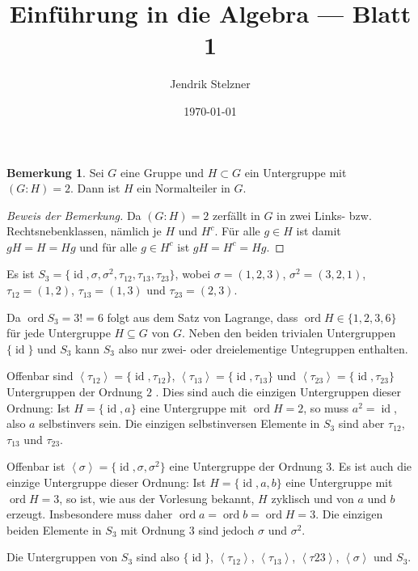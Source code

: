 \documentclass[a4paper,10pt]{article}
\title{Einführung in die Algebra — Blatt 1}
\author{Jendrik Stelzner}
\date{\today}
\theoremstyle{definition}
\newtheorem*{bem}{Bemerkung}
\newcommand{\id}{\operatorname{id}}
\newcommand{\ord}{\operatorname{ord}}
\newcommand{\gen}[1]{\left\langle#1\right\rangle}
\begin{document}
\maketitle





\section{}

\begin{bem}
 Sei $G$ eine Gruppe und $H \subset G$ ein Untergruppe mit $(G : H) = 2$. Dann ist $H$ ein Normalteiler in $G$.
\end{bem}
\begin{proof}[Beweis der Bemerkung]
 Da $(G : H) = 2$ zerfällt in $G$ in zwei Links- bzw. Rechtsnebenklassen, nämlich je $H$ und $H^c$. Für alle $g \in H$ ist damit $gH = H = Hg$ und für alle $g \in H^c$ ist $gH = H^c = Hg$.
\end{proof}

Es ist $S_3 = \{\id, \sigma, \sigma^2, \tau_{12}, \tau_{13}, \tau_{23} \}$, wobei $\sigma = (1,2,3)$, $\sigma^2 = (3,2,1)$, $\tau_{12} = (1,2)$, $\tau_{13} = (1,3)$ und $\tau_{23} = (2,3)$.

Da $\ord S_3 = 3! = 6$ folgt aus dem Satz von Lagrange, dass $\ord H \in \{1,2,3,6\}$ für jede Untergruppe $H \subseteq G$ von $G$. Neben den beiden trivialen Untergruppen $\{\id\}$ und $S_3$ kann $S_3$ also nur zwei- oder dreielementige Untegruppen enthalten.

Offenbar sind $\gen{\tau_{12}} = \{\id,\tau_{12}\}$, $\gen{\tau_{13}} = \{\id, \tau_{13}\}$ und $\gen{\tau_{23}} = \{\id, \tau_{23}\}$ Untergruppen der Ordnung $2$ . Dies sind auch die einzigen Untergruppen dieser Ordnung: Ist $H = \{\id, a\}$ eine Untergruppe mit $\ord H = 2$, so muss $a^2 = \id$, also $a$ selbstinvers sein. Die einzigen selbstinversen Elemente in $S_3$ sind aber $\tau_{12}$, $\tau_{13}$ und $\tau_{23}$.

Offenbar ist $\gen{\sigma} = \{\id, \sigma, \sigma^2\}$ eine Untergruppe der Ordnung $3$. Es ist auch die einzige Untergruppe dieser Ordnung: Ist $H = \{\id, a, b\}$ eine Untergruppe mit $\ord H = 3$, so ist, wie aus der Vorlesung bekannt, $H$ zyklisch und von $a$ und $b$ erzeugt. Insbesondere muss daher $\ord a = \ord b = \ord H = 3$. Die einzigen beiden Elemente in $S_3$ mit Ordnung $3$ sind jedoch $\sigma$ und $\sigma^2$.

Die Untergruppen von $S_3$ sind also $\{\id\}$, $\gen{\tau_{12}}$, $\gen{\tau_{13}}$, $\gen{\tau{23}}$, $\gen{\sigma}$ und $S_3$.
\end{document}
